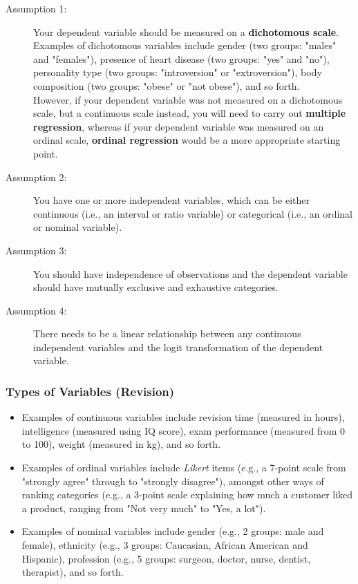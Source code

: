 \documentclass[12pt]{article}
\begin{document}
\begin{description}
\item[Assumption 1:] Your dependent variable should be measured on a \textbf{dichotomous scale}. Examples of dichotomous variables include gender (two groups: "males" and "females"), presence of heart disease (two groups: "yes" and "no"), personality type (two groups: "introversion" or "extroversion"), body composition (two groups: "obese" or "not obese"), and so forth. \\
\newline
However, if your dependent variable was not measured on a dichotomous scale, but a continuous scale instead, you will need to carry out \textbf{multiple regression}, whereas if your dependent variable was measured on an ordinal scale, \textbf{ordinal regression} would be a more appropriate starting point.

\item[Assumption 2:] You have one or more independent variables, which can be either continuous (i.e., an interval or ratio variable) or categorical (i.e., an ordinal or nominal variable). 



\item[Assumption 3:] You should have independence of observations and the dependent variable should have mutually exclusive and exhaustive categories.

\item[Assumption 4:] There needs to be a linear relationship between any continuous independent variables and the logit transformation of the dependent variable. 
\end{description}
\begin{framed}
\newpage
\subsubsection*{Types of Variables (Revision)}
\begin{itemize}
\item Examples of continuous variables include revision time (measured in hours), intelligence (measured using IQ score), exam performance (measured from 0 to 100), weight (measured in kg), and so forth. 

\item Examples of ordinal variables include \textit{Likert} items (e.g., a 7-point scale from "strongly agree" through to "strongly disagree"), amongst other ways of ranking categories (e.g., a 3-point scale explaining how much a customer liked a product, ranging from "Not very much" to "Yes, a lot"). 
\item Examples of nominal variables include gender (e.g., 2 groups: male and female), ethnicity (e.g., 3 groups: Caucasian, African American and Hispanic), profession (e.g., 5 groups: surgeon, doctor, nurse, dentist, therapist), and so forth.
\end{itemize}
\end{framed}

\end{document}
